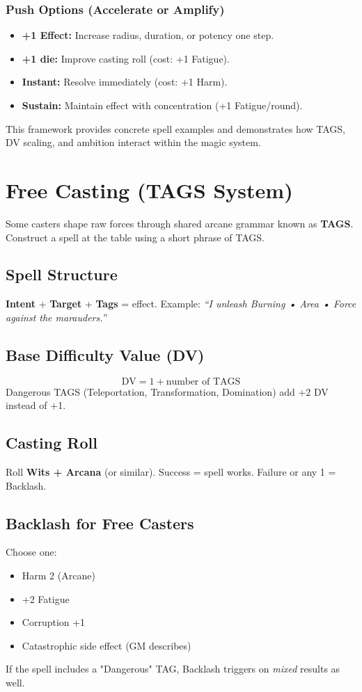 \subsubsection{Push Options (Accelerate or Amplify)}
\begin{itemize}
    \item \textbf{+1 Effect:} Increase radius, duration, or potency one step.
    \item \textbf{+1 die:} Improve casting roll (cost: +1 Fatigue).
    \item \textbf{Instant:} Resolve immediately (cost: +1 Harm).
    \item \textbf{Sustain:} Maintain effect with concentration (+1 Fatigue/round).
\end{itemize}

\noindent This framework provides concrete spell examples and demonstrates how TAGS, DV scaling, and ambition interact within the magic system.

\section{Free Casting (TAGS System)}\label{sec:free_casting_tags}

Some casters shape raw forces through shared arcane grammar known as \textbf{TAGS}. Construct a spell at the table using a short phrase of TAGS.

\subsection{Spell Structure}
\textbf{Intent} + \textbf{Target} + \textbf{Tags} = effect. Example: \textit{``I unleash Burning • Area • Force against the marauders.''}

\subsection{Base Difficulty Value (DV)}
\[
\text{DV} = 1 + \text{number of TAGS}
\]
Dangerous TAGS (Teleportation, Transformation, Domination) add +2 DV instead of +1.

\subsection{Casting Roll}
Roll \textbf{Wits + Arcana} (or similar). Success = spell works. Failure or any 1 = Backlash.

\subsection{Backlash for Free Casters}
Choose one:
\begin{itemize}
    \item Harm 2 (Arcane)
    \item +2 Fatigue
    \item Corruption +1
    \item Catastrophic side effect (GM describes)
\end{itemize}
If the spell includes a "Dangerous" TAG, Backlash triggers on \emph{mixed} results as well.

